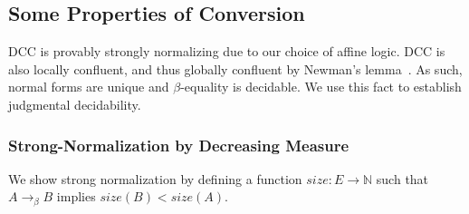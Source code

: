 \documentclass{lmcs}
\newcommand{\arr}{\rightarrow}
\newcommand{\barr}{\arr_{\beta}}
\begin{document}
\subsection{Some Properties of Conversion}\label{sec:thmsconv}

DCC is provably strongly normalizing due to our choice of affine logic. DCC is also locally confluent, and thus globally confluent by Newman's lemma~\cite{newman1942theories}. As such, normal forms are unique and \(\beta\)-equality is decidable. We use this fact to establish judgmental decidability.

\subsubsection{Strong-Normalization by Decreasing Measure}

We show strong normalization by defining a function \(size : E \rightarrow \mathbb{N}\) such that \(A \barr B\) implies \(size(B) < size(A)\).
\end{document}
